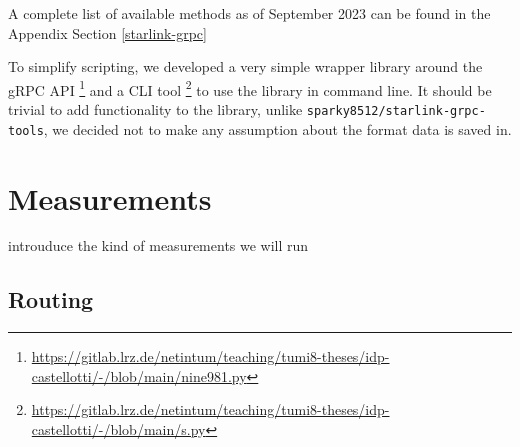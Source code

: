 \documentclass[IN,11pt,twoside,openright,idp,english]{tumthesis}
\begin{document}
A complete list of available methods as of September 2023 can be found in the Appendix Section \ref{starlink-grpc}

To simplify scripting, we developed a very simple wrapper library around the gRPC API  \footnote{\url{https://gitlab.lrz.de/netintum/teaching/tumi8-theses/idp-castellotti/-/blob/main/nine981.py}} and a CLI tool \footnote{\url{https://gitlab.lrz.de/netintum/teaching/tumi8-theses/idp-castellotti/-/blob/main/s.py}} to use the library in command line. It should be trivial to add functionality to the library, unlike \texttt{sparky8512/starlink-grpc-tools}, we decided not to make any assumption about the format data is saved in.


\chapter{Measurements}

introuduce the kind of measurements we will run

\section{Routing}




\end{document}
